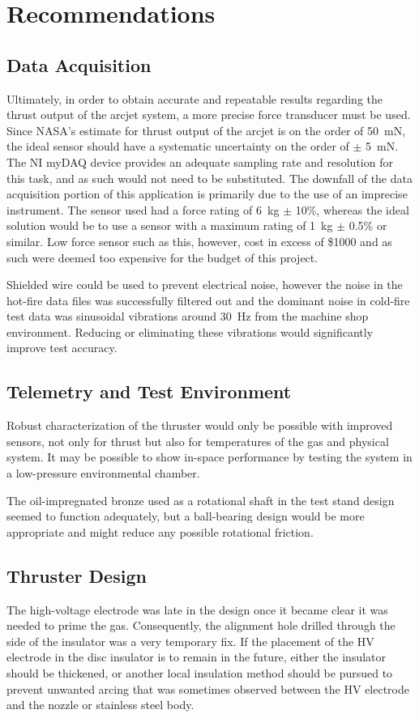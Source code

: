 \documentclass[journal]{IEEEtran}
\begin{document}
\section{Recommendations}
\subsection{Data Acquisition}
Ultimately, in order to obtain accurate and repeatable results regarding the thrust output of the arcjet system, a more precise force transducer must be used.
Since NASA's estimate for thrust output of the arcjet is on the order of \SI{50}{\milli\newton}, the ideal sensor should have a systematic uncertainty on the order of $\pm$ \SI{5}{\milli\newton}.
The NI myDAQ device provides an adequate sampling rate and resolution for this task, and as such would not need to be substituted.
The downfall of the data acquisition portion of this application is primarily due to the use of an imprecise instrument.
The sensor used had a force rating of \SI{6}{\kilo\gram} $\pm$ 10\%, whereas the ideal solution would be to use a sensor with a maximum rating of \SI{1}{\kilo\gram} $\pm$ 0.5\% or similar.
Low force sensor such as this, however, cost in excess of \$1000 and as such were deemed too expensive for the budget of this project.

Shielded wire could be used to prevent electrical noise, however the noise in the hot-fire data files was successfully filtered out and the dominant noise in cold-fire test data was sinusoidal vibrations around \SI{30}{Hz} from the machine shop environment.
Reducing or eliminating these vibrations would significantly improve test accuracy.

\subsection{Telemetry and Test Environment}
Robust characterization of the thruster would only be possible with improved sensors, not only for thrust but also for temperatures of the gas and physical system.
It may be possible to show in-space performance by testing the system in a low-pressure environmental chamber.

The oil-impregnated bronze used as a rotational shaft in the test stand design seemed to function adequately, but a ball-bearing design would be more appropriate and might reduce any possible rotational friction.

\subsection{Thruster Design}
The high-voltage electrode was late in the design once it became clear it was needed to prime the gas.
Consequently, the alignment hole drilled through the side of the insulator was a very temporary fix.
If the placement of the HV electrode in the disc insulator is to remain in the future, either the insulator should be thickened, or another local insulation method should be pursued to prevent unwanted arcing that was sometimes observed between the HV electrode and the nozzle or stainless steel body.
\end{document}
